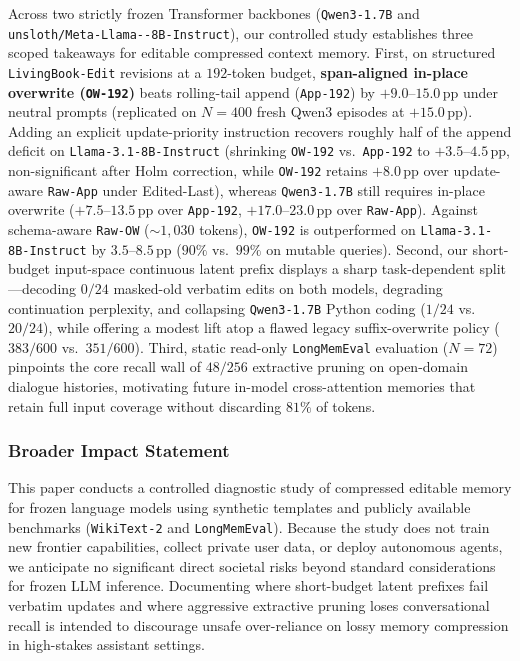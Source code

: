 \documentclass[11pt]{article}
\newcommand{\pp}{\,\text{pp}}
\renewcommand{\_}{\origunderscore\allowbreak}
\begin{document}
Across two strictly frozen Transformer backbones (\texttt{Qwen3-1.7B} and \texttt{unsloth/\allowbreak Meta-\allowbreak Llama--8B-Instruct}), our controlled study establishes three scoped takeaways for editable compressed context memory. First, on structured \texttt{LivingBook-Edit} revisions at a $192$-token budget, \textbf{span-aligned in-place overwrite (\texttt{OW-192})} beats rolling-tail append (\texttt{App-192}) by $+9.0$--$15.0\pp$ under neutral prompts (replicated on $N=400$ fresh Qwen3 episodes at $+15.0\pp$). Adding an explicit update-priority instruction recovers roughly half of the append deficit on \texttt{Llama-3.1-8B-Instruct} (shrinking \texttt{OW-192} vs.\ \texttt{App-192} to $+3.5$--$4.5\pp$, non-significant after Holm correction, while \texttt{OW-192} retains $+8.0\pp$ over update-aware \texttt{Raw-App} under Edited-Last), whereas \texttt{Qwen3-1.7B} still requires in-place overwrite ($+7.5$--$13.5\pp$ over \texttt{App-192}, $+17.0$--$23.0\pp$ over \texttt{Raw-App}). Against schema-aware \texttt{Raw-OW} ($\sim 1{,}030$ tokens), \texttt{OW-192} is outperformed on \texttt{Llama-3.1-8B-Instruct} by $3.5$--$8.5\pp$ ($90\%$ vs.\ $99\%$ on mutable queries). Second, our short-budget input-space continuous latent prefix displays a sharp task-dependent split---decoding $0/24$ masked-old verbatim edits on both models, degrading continuation perplexity, and collapsing \texttt{Qwen3-1.7B} Python coding ($1/24$ vs.\ $20/24$), while offering a modest lift atop a flawed legacy suffix-overwrite policy ($383/600$ vs.\ $351/600$). Third, static read-only \texttt{LongMemEval} evaluation ($N=72$) pinpoints the core recall wall of $48/256$ extractive pruning on open-domain dialogue histories, motivating future in-model cross-attention memories that retain full input coverage without discarding $81\%$ of tokens.

\subsubsection*{Broader Impact Statement}
This paper conducts a controlled diagnostic study of compressed editable memory for frozen language models using synthetic templates and publicly available benchmarks (\texttt{WikiText-2} and \texttt{LongMemEval}). Because the study does not train new frontier capabilities, collect private user data, or deploy autonomous agents, we anticipate no significant direct societal risks beyond standard considerations for frozen LLM inference. Documenting where short-budget latent prefixes fail verbatim updates and where aggressive extractive pruning loses conversational recall is intended to discourage unsafe over-reliance on lossy memory compression in high-stakes assistant settings.
\end{document}
